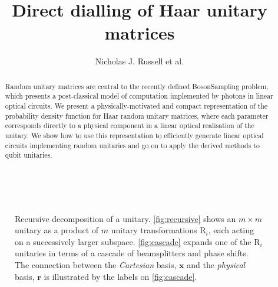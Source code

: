 \documentclass[aps,prl,twocolumn,floatfix]{revtex4}
\renewcommand{\vec}[1]{\mathbf{#1}}
\newcommand{\mat}[1]{\mathrm{#1}}
\newcommand{\by}{\times}
\newcommand{\bosonsampling}{\textsc BosonSampling}
\begin{document}
\title{Direct dialling of Haar unitary matrices}

\author{Nicholas J. Russell et al.}

\begin{abstract}
Random unitary matrices are central to the recently defined \bosonsampling{}
problem, which presents a post-classical model of computation implemented by
photons in linear optical circuits. We present a physically-motivated and
compact representation of the probability density function for Haar random
unitary matrices, where each parameter corresponds directly to a physical
component in a linear optical realisation of the unitary. We show how to use
this representation to efficiently generate linear optical circuits
implementing random unitaries and go on to apply the derived methods to qubit
unitaries.
\end{abstract}

\maketitle

\begin{figure}[t]
  \centering
   \\
  \caption{Recursive decomposition of a unitary. \ref{fig:recursive} shows an
    \(m \by m\) unitary as a product of \(m\) unitary transformations
    \(\mat{R}_{i}\), each acting on a successively larger subspace.
    \ref{fig:cascade} expands one of the \(\mat{R}_{i}\) unitaries in terms of
    a cascade of beamsplitters and phase shifts. The connection between the
    \emph{Cartesian} basis, \(\vec{x}\) and the \emph{physical} basis,
    \(\vec{r}\) is illustrated by the labels on \ref{fig:cascade}.}
  \label{fig:reck}
\end{figure}
\end{document}
